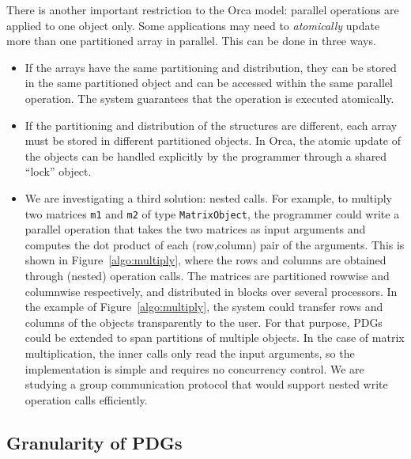\documentclass{acmtrans2e}
\begin{document}

There is another important restriction to the Orca model: parallel
operations are applied to one object only. Some applications may need
to \emph{atomically} update more than one partitioned array in
parallel. This can be done in three ways.

\begin{itemize}
\item
If the arrays have the same partitioning and distribution, they can be
stored in the same partitioned object and can be accessed within the
same parallel operation. The system guarantees that the operation is
executed atomically.
\item
If the partitioning and distribution of the structures are different,
each array must be stored in different partitioned objects. In Orca,
the atomic update of the objects can be handled explicitly by the
programmer through a shared ``lock'' object.
\item
We are investigating a third solution: nested calls. For example, to
multiply two matrices \verb+m1+ and \verb+m2+ of type
\verb+MatrixObject+, the programmer could write a parallel operation
that takes the two matrices as input arguments and computes the dot
product of each (row,column) pair of the arguments. This is shown in
Figure~\ref{algo:multiply}, where the rows and columns are
obtained through (nested) operation calls. The matrices are
partitioned rowwise and columnwise respectively, and distributed in
blocks over several processors.
In the example of
Figure~\ref{algo:multiply}, the system could transfer rows and columns
of the objects transparently to the user. For that purpose, PDGs could
be extended to span partitions of multiple objects. In the case of
matrix multiplication, the inner calls only read the input arguments,
so the implementation is simple and requires no concurrency
control. We are studying a group communication protocol that would
support nested write operation calls efficiently.
\end{itemize}

\subsection{Granularity of PDGs}
\end{document}
